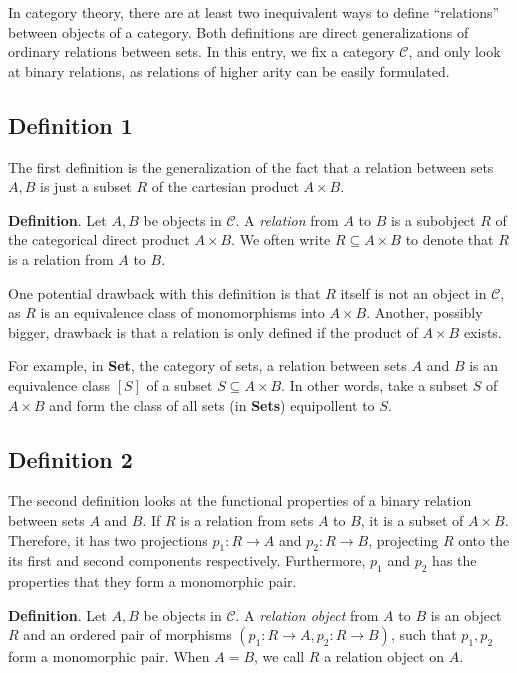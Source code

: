 \documentclass[12pt]{article}
\begin{document}
In category theory, there are at least two inequivalent ways to define ``relations'' between objects of a category.  Both definitions are direct generalizations of ordinary relations between sets.  In this entry, we fix a category $\mathcal{C}$, and only look at binary relations, as relations of higher arity can be easily formulated.

\subsection*{Definition 1}
The first definition is the generalization of the fact that a relation between sets $A, B$ is just a subset $R$ of the cartesian product $A\times B$.

\textbf{Definition}.  Let $A,B$ be objects in $\mathcal{C}$.  A \emph{relation} from $A$ to $B$ is a subobject $R$ of the categorical direct product $A \times B$.  We often write $R\subseteq A\times B$ to denote that $R$ is a relation from $A$ to $B$.

One potential drawback with this definition is that $R$ itself is not an object in $\mathcal{C}$, as $R$ is an equivalence class of monomorphisms into $A\times B$.  Another, possibly bigger, drawback is that a relation is only defined if the product of $A\times B$ exists.

For example, in \textbf{Set}, the category of sets, a relation between sets $A$ and $B$ is an equivalence class $[S]$ of a subset $S\subseteq A\times B$.  In other words, take a subset $S$ of $A\times B$ and form the class of all sets (in \textbf{Sets}) equipollent to $S$.


\subsection*{Definition 2}

The second definition looks at the functional properties of a binary relation between sets $A$ and $B$.  If $R$ is a relation from sets $A$ to $B$, it is a subset of $A\times B$.  Therefore, it has two projections $p_1\!:\!R\to A$ and $p_2\!:\!R\to B$, projecting $R$ onto the its first and second components respectively.  Furthermore, $p_1$ and $p_2$ has the properties that they form a monomorphic pair.

\textbf{Definition}.  Let $A,B$ be objects in $\mathcal{C}$.  A \emph{relation object} from $A$ to $B$ is an object $R$ and an ordered pair of morphisms $(p_1\!:\!R\to A,p_2\!:\!R\to B)$, such that $p_1,p_2$ form a monomorphic pair.  When $A=B$, we call $R$ a relation object on $A$.
\end{document}
